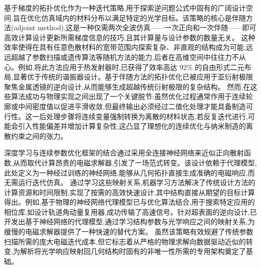 基于梯度的拓扑优化作为一种迭代策略,用于探索逆问题公式中固有的广阔设计空间,旨在优化仿真域内的材料分布以满足特定的光学目标。该策略的核心是伴随方法(adjoint method),这是一种仅需两次全波仿真------一次正向和一次伴随------即可高效计算设计更新所需梯度信息的技巧,且其计算量与设计参数的数量无关。\citep{doi_10_1088_1367_2630_acfcd6_32444f17} 这种效率使得在具有任意色散材料的宽带范围内探索复杂、非直观的结构成为可能,远远超越了参数扫描或遗传算法等随机方法的能力,后者在高维空间中往往力不从心。例如,将此方法应用于热发射器时,已获得了效率高达 92\% 的自由形式二元布局,显著优于传统的谐振器设计。基于伴随方法的拓扑优化已被应用于亚衍射极限聚焦金属透镜的逆向设计,从而能够生成超越传统衍射极限的复杂结构。\citep{doi_10_1088_1367_2630_acfcd6_32444f17} 然而,在这些算法成功与物理实现之间出现了一个关键脱节:虽然优化过程通常作用于连续轮廓或中间密度值以促进平滑收敛,但最终输出必须经过二值化处理才能具备制造可行性。这一后处理步骤将连续变量强制转换为离散的材料状态,若反复迭代进行,可能会引入性能偏差并增加计算复杂性,这凸显了理想化的连续优化与纳米制造的离散约束之间的张力。\citep{doi_10_48550_arxiv_2603_15210_fdcfb92f} \citep{doi_10_1021_acsphotonics_3c00572_fda8f742} \citep{doi_10_1002_adom_202500249_9967e710}

深度学习与连续参数优化框架的结合通过采用全连接神经网络来近似正向散射函数,从而取代计算昂贵的电磁求解器,引发了一场范式转变。该设计依赖于代理模型,此处定义为一种经过训练的神经网络,能够从几何拓扑直接生成准确的电磁响应,而无需运行迭代仿真。\citep{doi_10_1109_jmmct_2025_3544270_6b4eb6dd} 通过学习这些映射关系,机器学习方法解决了传统设计方法的计算资源和时间限制,实现了按需的高效快速设计,其中结构直接从期望的目标计算得出。例如,基于物理的神经网络代理模型已与优化算法结合,用于搜索特定应用的相位库,如设计轨道角动量复用器,成功传输了高速信号。针对超表面的逆向设计,已开发出基于神经网络的代理模型,通过学习结构参数与光学响应之间的映射关系,为缓慢的电磁求解器提供了一种快速的替代方案。\citep{doi_10_1364_prj_450564_4b46735d} 虽然该策略有效规避了传统参数扫描所需的庞大电磁迭代成本,但它标志着从严格的物理求解向数据驱动近似的转变,为解析将光学响应映射回几何结构时固有的非唯一性所需的专用架构奠定了基础。\citep{doi_10_71465_fapm546_bda368a5} \citep{doi_10_1364_prj_450564_4b46735d} \citep{doi_10_1088_1361_6463_ab8036_d433363a}

